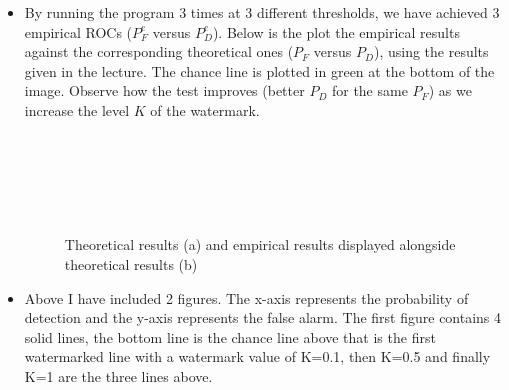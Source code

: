 \documentclass[]{assignment}
\begin{document}
\begin{itemize}
\setlength{\fboxsep}{0pt}%
\setlength{\fboxrule}{1pt}%


\item By running the program 3 times at 3 different thresholds, we have achieved 3 empirical ROCs ($P_F^e$ versus $P_D^e$). Below is the plot the empirical results  against the corresponding theoretical ones ($P_F$ versus $P_D$),  using the results given in the lecture. The chance line is plotted in green at the bottom of the image. Observe how the test  improves (better $P_D$ for the same $P_F$) as we increase the level  $K$ of the watermark.


\begin{figure}[h]
\centering
\fboxsep 0mm
\parbox{6cm}{\\}
~~~
\parbox{6cm}{\\}
\caption{\label{fig:imgfilter1} Theoretical results (a) and empirical results displayed alongside theoretical results (b)}
\end{figure} 

\item Above I have included 2 figures. The x-axis represents the probability of detection and the y-axis represents the false alarm. The first figure contains 4 solid lines, the bottom line is the chance line above that is the first watermarked line with a watermark value of K=0.1, then K=0.5 and finally K=1 are the three lines above.  


\end{itemize}
\end{document}
